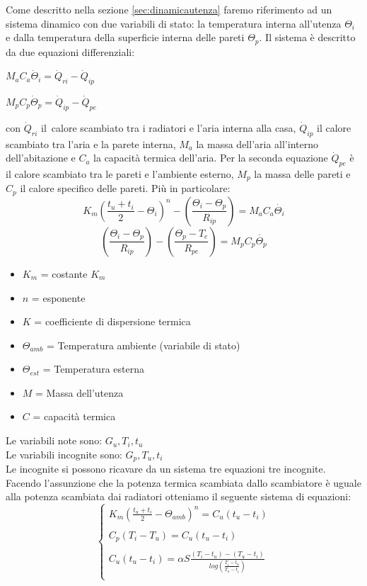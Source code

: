 \documentclass[laurea,oneside,11pt]{USiena_tesiLM}
\begin{document}
Come descritto nella sezione \ref{sec:dinamicautenza} faremo riferimento ad un sistema dinamico con due variabili di stato: la temperatura interna all'utenza  $\Theta_i$  e dalla temperatura della superficie interna delle pareti  $\Theta_p$. Il sistema è  descritto  da due equazioni differenziali:
\begin{center}
$M_aC_a \dot{\Theta}_i = \dot{Q}_{ri} - \dot{Q}_{ip}$ 
\end{center}
\begin{center}
$M_pC_p \dot{\Theta}_p = \dot{Q}_{ip} - \dot{Q}_{pe}$
\end{center}
con $\dot{Q}_{ri}$ il\ calore scambiato tra i radiatori e l'aria interna alla casa, $\dot{Q}_{ip}$ il calore scambiato tra l'aria e la parete interna, $M_a$ la massa dell'aria all'interno dell'abitazione e $C_a$ la capacità termica dell'aria. Per la seconda equazione $ \dot{Q}_{pe}$ è il calore scambiato tra le pareti e l'ambiente esterno, $M_p$ la massa delle pareti e $C_p$ il calore specifico delle pareti.
Più in particolare:
\begin{equation}
K_m\left(\frac{t_u + t_i}{2} - \Theta_{i}\right)^n - \left(\frac{\Theta_{i} - \Theta_p}{R_{ip}}\right) = M_aC_a \dot{\Theta_i}
\end{equation}
\begin{equation}
\left(\frac{\Theta_{i} - \Theta_p}{R_{ip}}\right) - \left(\frac{\Theta_{p} - T_e}{R_{pe}}\right) = M_pC_p \dot{\Theta_p}
\end{equation}
\begin{itemize}
\item[] $K_m$ = costante $K_m$
\item[]$n$ = esponente
\item[]$K$ = coefficiente di dispersione termica
\item[]$\Theta_{amb}$ = Temperatura ambiente (variabile di stato)
\item[]$\Theta_{est}$ = Temperatura esterna
\item[]$M$ = Massa dell'utenza
\item[]$C$ = capacit\`a  termica
\end{itemize}

Le variabili note sono: $G_u, T_i, t_u$\\
Le variabili incognite sono: $G_p, T_u, t_i$\\

Le incognite si possono ricavare da un sistema tre equazioni tre incognite. Facendo l'assunzione che la potenza termica scambiata dallo scambiatore \`e  uguale alla potenza scambiata dai radiatori otteniamo il seguente sistema di equazioni:
\begin{equation}
\left \{
\begin{array}{rl}
K_m(\frac{t_u + t_i}{2} - \Theta_{amb})^n = C_u(t_u - t_i)\\
\\
C_p(T_i - T_u) = C_u(t_u - t_i)\\
\\
C_u(t_u - t_i) = \alpha S \frac{(T_i - t_u)-(T_u - t_i )}{log\left( \frac{T_i - t_u}{T_u - t_i } \right)}\\
\end{array}
\right.
\end{equation}
\end{document}
